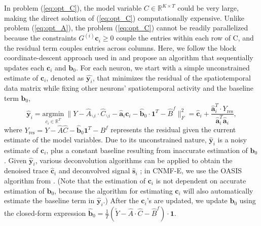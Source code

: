 \documentclass[9pt,lineno]{elife}
\begin{document}
In problem (\ref{eq:opt_C}), the model variable $C\in\mathbb{R}^{K\times T}$ could be very large, making the direct solution of (\ref{eq:opt_C}) computationally expensive. Unlike problem (\ref{eq:opt_A}), the problem (\ref{eq:opt_C}) cannot be readily parallelized because the constraints $G^{(i)}\bm{c}_i\geq 0$ couple the entries within each row of C, and the residual term couples entries across columns. Here, we follow the block coordinate-descent approach used in \citep{Pnevmatikakis2016} and propose an algorithm that sequentially updates each $\bm{c}_i$ and $\bm{b}_0$. For each neuron, we start with a simple unconstrained estimate of $\bm{c}_i$, denoted as $\hat{\bm{y}_{i}}$, that minimizes the residual of the spatiotemporal data matrix while fixing other neurons' spatiotemporal activity and the baseline term $\bm{b}_0$, 
\begin{equation}
  \hat{\bm{y}}_i = \underset{c_i\in \mathbb{R}^T}{\text{argmin}} ~\|Y-\hat{A}_{\backslash i} \cdot \hat{C}_{\backslash i} - \hat{\bm{a}}_i\bm{c}_i-\hat{\bm{b}}_0\cdot \bm{1}^T- \hat{B}^f\|_F^2 = \hat{\bm{c}}_i + \frac{\hat{\bm{a}}_i^T\cdot {Y}_{\text{res}}}{\hat{\bm{a}}_i^T\hat{\bm{a}}_i},  \label{eq:y_raw}
\end{equation}
where $Y_{\text{res}}=Y-\hat{A}\hat{C}-\hat{\bm{b}}_0\bm{1}^T-B^f$ represents the residual given the current estimate of the model variables.  Due to its unconstrained nature, $\hat{\bm{y}}_i$ is a noisy estimate of $\bm{c}_i$, plus a constant baseline resulting from inaccurate estimation of  $\bm{b}_0$. Given $\hat{\bm{y}}_i$,  various deconvolution algorithms can be applied to obtain the denoised trace $\hat{\bm{c}}_i$ and deconvolved signal $\hat{\bm{s}}_i$ \citep{Vogelstein2009,Pnevmatikakis2013,Deneux2016,Friedrich2017,Jewell2017}; in CNMF-E, we use the OASIS algorithm from \citep{Friedrich2017}. (Note that the estimation of $\bm{c}_i$ is not dependent on accurate estimation of $\bm{b}_0$, because the algorithm for estimating $\bm{c}_i$ will also automatically estimate the baseline term in $\hat{\bm{y}}_i$.) After the $\bm{c}_i$'s are updated, we update $\bm{b}_0$ using the closed-form expression $\hat{\bm{b}}_0=\frac{1}{T}(\tilde{Y}-\hat{A}\cdot \hat{C}-\hat{B}^f)\cdot \bm{1}$.
\end{document}
